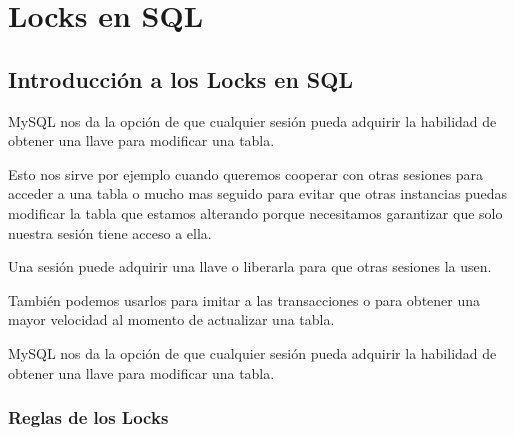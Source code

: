 \documentclass[12pt, fleqn]{report}                             %
\theoremstyle{break}                                            %
\begin{document}
    \clearpage
    \chapter{Locks en SQL}


        \clearpage
        \section{Introducción a los Locks en SQL}

            MySQL nos da la opción de que cualquier sesión pueda adquirir la habilidad de obtener una llave
            para modificar una tabla.

            Esto nos sirve por ejemplo cuando queremos cooperar con otras sesiones para acceder a una tabla
            o mucho mas seguido para evitar que otras instancias puedas modificar la tabla que estamos alterando
            porque necesitamos garantizar que solo nuestra sesión tiene acceso a ella.

            Una sesión puede adquirir una llave o liberarla para que otras sesiones la usen.

            También podemos usarlos para imitar a las transacciones o para obtener una mayor velocidad al momento
            de actualizar una tabla.

            MySQL nos da la opción de que cualquier sesión pueda adquirir la habilidad de obtener una llave
            para modificar una tabla.


            \subsection{Reglas de los Locks}
\end{document}
